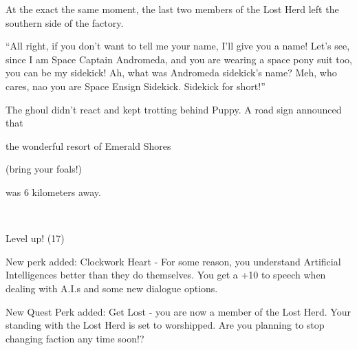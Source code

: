 At the exact the same moment, the last two members of the Lost Herd left the southern side of the factory.

``All right, if you don't want to tell me your name, I'll give you a name! Let's see, since I am Space Captain Andromeda, and you are wearing a space pony suit too, you can be my sidekick! Ah, what was Andromeda sidekick's name? Meh, who cares, nao you are Space Ensign Sidekick. Sidekick for short!''

The ghoul didn't react and kept trotting behind Puppy. A road sign announced that 

\begin{center}
	the wonderful resort of Emerald Shores 
	
	(bring your foals!) 
	
	was 6 kilometers away.
\end{center}

~\vfill


\begin{engnote}
		Level up! (17)
	
		New perk added: Clockwork Heart - For some reason, you understand Artificial Intelligences better than they do themselves. You get a +10 to speech when dealing with A.I.s and some new dialogue options.
	
		New Quest Perk added: Get Lost - you are now a member of the Lost Herd. Your standing with the Lost Herd is set to worshipped. Are you planning to stop changing faction any time soon!?
\end{engnote}

